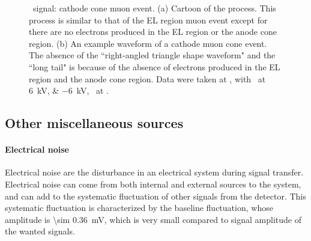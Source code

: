 \begin{figure}[!htbp]
\begin{subfigure}[b]{0.7\textwidth}
		\caption{}
		\label{fig:cathode muon b}
	\end{subfigure}
	\caption[\gtest\ signal: cathode cone muon event.]{\gtest\ signal: cathode cone muon event. (a) Cartoon of the process. This process is similar to that of the EL region muon event except for there are no electrons produced in the EL region or the anode cone region. (b) An example waveform of a cathode muon cone event. The absence of the ``right-angled triangle shape waveform" and the ``long tail"  is because of the absence of electrons produced in the EL region and the anode cone region.  Data were taken at , with \opvtvb\ at \SIlist{+6;-6}{kV}, \opgd\ at \standarddensity .%
	}
	\label{fig:cathode muon}
\end{figure}

\subsection{Other miscellaneous sources}
\label{sec:events misc}
\paragraph{Electrical noise} 
\label{sec:events noise}
Electrical noise are the disturbance in an electrical system during signal transfer. Electrical noise can come from both internal and external sources to the system, and can add to the systematic fluctuation of other signals from the \gtest detector. This systematic fluctuation is characterized by the baseline fluctuation, whose amplitude is \SI{\sim 0.36}{\mV}, which is very small compared to signal amplitude of the wanted signals. 

